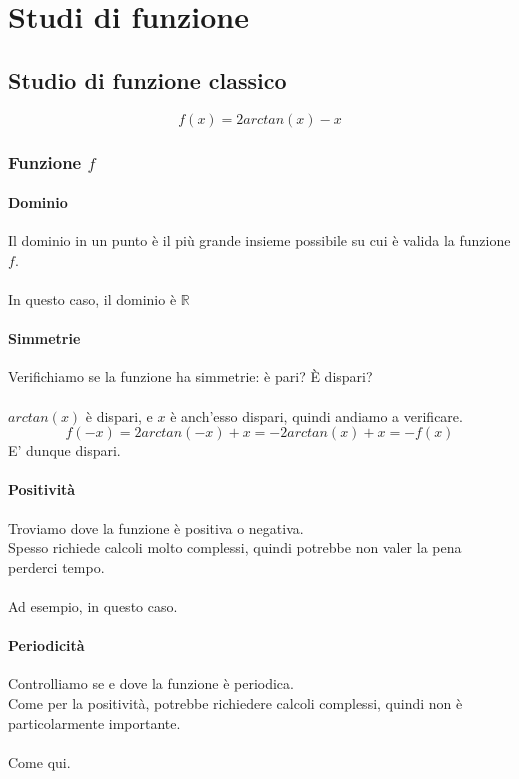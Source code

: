 \documentclass{article}
\begin{document}
\section{Studi di funzione}

\subsection{Studio di funzione classico}

\[f(x) = 2 arctan(x) - x\]

\subsubsection{Funzione \(f\)}

\paragraph{Dominio}
Il dominio in un punto è il più grande insieme possibile su cui è valida la funzione \(f\).\\\\
In questo caso, il dominio è \(\mathbb{R}\)

\paragraph{Simmetrie}
Verifichiamo se la funzione ha simmetrie: è pari? È dispari?\\\\
\(arctan(x)\) è dispari, e \(x\) è anch'esso dispari, quindi andiamo a verificare.\\
\[f(-x) = 2 arctan(-x) + x = -2 arctan(x) + x = -f(x)\]
E' dunque dispari.

\paragraph{Positività}
Troviamo dove la funzione è positiva o negativa.\\
Spesso richiede calcoli molto complessi, quindi potrebbe non valer la pena perderci tempo.\\\\
Ad esempio, in questo caso.

\paragraph{Periodicità}
Controlliamo se e dove la funzione è periodica.\\
Come per la positività, potrebbe richiedere calcoli complessi, quindi non è particolarmente importante.\\\\
Come qui.
\end{document}
